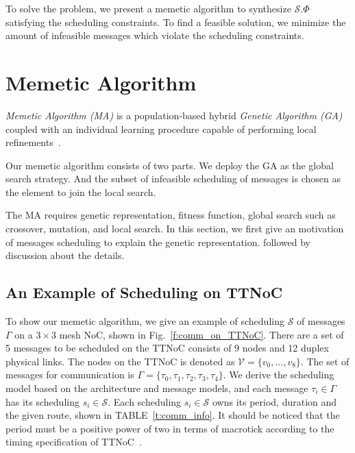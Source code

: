 \documentclass[journal]{IEEEtran}
\newcommand{\calV}{\mathcal{V}}
\newcommand{\calS}{\mathcal{S}}
\theoremstyle{remark}
\begin{document}
To solve the problem, we present a memetic algorithm to synthesize
$\calS.\Phi$ satisfying the scheduling constraints. 
To find a feasible solution,
 we minimize the amount of infeasible messages which violate the scheduling constraints.



\section{Memetic Algorithm \label{s:algorithm}}
\emph{Memetic Algorithm (MA)} is a population-based hybrid
\emph{Genetic Algorithm (GA)} coupled with an individual learning
procedure capable of performing local refinements~\cite{DBLP:journals/cim/OngLC10}.

Our memetic algorithm consists of two parts. We deploy the GA as the global search strategy.
And the subset of infeasible scheduling of messages is chosen as the element to join the local search.

The MA requires genetic representation,
 fitness function,
  global search such as crossover, mutation,
   and local search. 
In this section, we first give an motivation of messages scheduling to explain the genetic representation.
followed by discussion about the details.

\subsection{An Example of Scheduling on TTNoC}
To show our memetic algorithm,
 we give an example of scheduling $\calS$ of messages $\Gamma$ on a $3\times 3$ mesh NoC,
 shown in Fig.~\ref{f:comm_on_TTNoC}. 
There are a set of 5 messages to be scheduled on the TTNoC consists of 9 nodes and 12 duplex physical links.
The nodes on the TTNoC is denoted as $\calV=\{v_0,\dots,v_8\}$.
The set of messages for communication is $\Gamma=\{\tau_0,\tau_1,\tau_2,\tau_3,\tau_4\}$.
We derive the scheduling model based on the architecture and message models,
 and each message $\tau_i\in\Gamma$ has its scheduling $s_i\in\calS$.
Each scheduling $s_i\in\calS$ owns its period, duration and the given route,
shown in TABLE~\ref{t:comm_info}.
It should be noticed that the period must be a positive power of two in terms of macrotick according to the timing specification of TTNoC~\cite{DBLP:conf/date/HuangBRBK12}.
\end{document}
